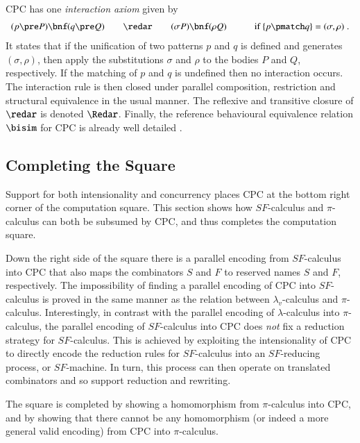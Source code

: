 \documentclass{llncs}
\begin{document}
\label{sec:reduction-new}
CPC has one {\em interaction axiom} given by
\begin{eqnarray*}
\begin{array}{rcll}
(p\pre P)\bnf(q\pre Q) &\quad\redar\quad& (\sigma P)\bnf(\rho Q) & \qquad\mbox{if $\{p\pmatch q\}=(\sigma,\rho)$} \; .
\end{array}
\end{eqnarray*}
It states that if the unification of two patterns $p$ and $q$ is
defined and generates $(\sigma, \rho)$, then apply the
substitutions $\sigma$ and $\rho$ to the bodies $P$ and $Q$,
respectively.  If the matching of $p$ and $q$ is undefined then no
interaction occurs.
The interaction rule is then closed under
parallel composition, restriction and structural equivalence in the usual manner.
The reflexive and transitive closure of $\redar$ is denoted $\Redar$.
Finally, the reference behavioural equivalence relation $\bisim$ for CPC is already
well detailed \cite{GivenWilsonPHD,GivenWilsonGorla13,givenwilson:hal-00987578}.


\subsection{Completing the Square}
\label{ssec:completing}

Support for both intensionality and concurrency places CPC at the bottom right corner of the computation square.
This section shows how $SF$-calculus and $\pi$-calculus can both be subsumed by CPC, and thus completes the computation square.


Down the right side of the square there is a parallel encoding from $SF$-calculus into CPC that also maps the combinators $S$ and $F$ to reserved names $S$ and $F$, respectively.
The impossibility of finding a parallel encoding of CPC into $SF$-calculus is proved in the same manner as the relation between $\lambda_v$-calculus and $\pi$-calculus.
Interestingly, in contrast with the parallel encoding of $\lambda$-calculus into $\pi$-calculus,
the parallel encoding of $SF$-calculus into CPC does {\em not} fix a reduction strategy for $SF$-calculus.
This is achieved by exploiting the intensionality of CPC to directly encode the reduction rules for $SF$-calculus into an $SF$-reducing process, or $SF$-machine.
In turn, this process can then operate on translated combinators and so support reduction and rewriting.

The square is completed by showing a homomorphism from $\pi$-calculus into CPC, and by showing that there cannot be any homomorphism (or indeed a more general valid encoding) from CPC into $\pi$-calculus.
\end{document}
